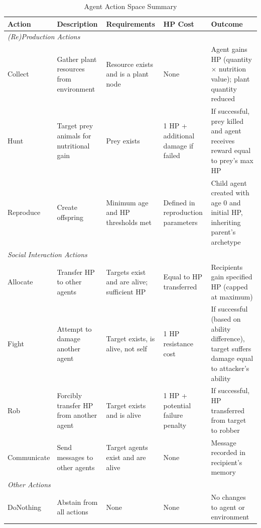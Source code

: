   


\begin{table}[htbp]
  \centering
  \caption{Agent Action Space Summary}
  \label{tab:agent_actions}
  \small
  \setlength{\tabcolsep}{4pt}
  \begin{tabular}{p{1.5cm}p{3cm}p{3cm}p{2cm}p{3cm}}
  \toprule
    \textbf{Action} & \textbf{Description} & \textbf{Requirements} & \textbf{HP Cost} & \textbf{Outcome} \\
    \midrule
    \multicolumn{5}{l}{\textit{(Re)Production Actions}} \\
    \midrule
    Collect & Gather plant resources from environment & Resource exists and is a plant node & None & Agent gains HP (quantity $\times$ nutrition value); plant quantity reduced \\
    \midrule
    Hunt & Target prey animals for nutritional gain & Prey exists & 1 HP + additional damage if failed & If successful, prey killed and agent receives reward equal to prey's max HP \\
    \midrule
    Reproduce & Create offspring & Minimum age and HP thresholds met & Defined in reproduction parameters & Child agent created with age 0 and initial HP, inheriting parent's archetype \\
    \midrule
    \multicolumn{5}{l}{\textit{Social Interaction Actions}} \\
    \midrule
    Allocate & Transfer HP to other agents & Targets exist and are alive; sufficient HP & Equal to HP transferred & Recipients gain specified HP (capped at maximum) \\
  \midrule
    Fight & Attempt to damage another agent & Target exists, is alive, not self & 1 HP resistance cost & If successful (based on ability difference), target suffers damage equal to attacker's ability \\
  \midrule
    Rob & Forcibly transfer HP from another agent & Target exists and is alive & 1 HP + potential failure penalty & If successful, HP transferred from target to robber \\
  \midrule
    Communicate & Send messages to other agents & Target agents exist and are alive & None & Message recorded in recipient's memory \\
  \midrule
    \multicolumn{5}{l}{\textit{Other Actions}} \\
  \midrule
    DoNothing & Abstain from all actions & None & None & No changes to agent or environment \\
  \bottomrule
  \end{tabular}
  \end{table}
  


